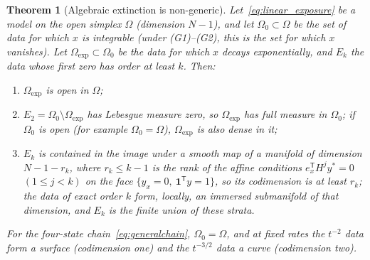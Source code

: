 \documentclass[11pt,a4paper]{article}
\newtheorem{theorem}{Theorem}[section]
\theoremstyle{definition}\newtheorem{definition}[theorem]{Definition}
\theoremstyle{remark}\newtheorem{remark}[theorem]{Remark}
\newcommand{\one}{\mathbf 1}
\begin{document}
\begin{theorem}[Algebraic extinction is non-generic]
\label{thm:generic}
Let~\eqref{eq:linear_exposure} be a model on the open simplex $\Omega$
(dimension $N-1$), and let $\Omega_0\subset\Omega$ be the set of data
for which $x$ is integrable (under (G1)--(G2), this is the set for which
$x$ vanishes). Let $\Omega_{\exp}\subset\Omega_0$ be the data for which
$x$ decays exponentially, and $E_k$ the data whose first zero has order
at least $k$. Then:
\begin{enumerate}[label=(\alph*)]
\item $\Omega_{\exp}$ is open in $\Omega$;
\item $E_2=\Omega_0\setminus\Omega_{\exp}$ has Lebesgue measure zero, so
$\Omega_{\exp}$ has full measure in $\Omega_0$; if $\Omega_0$ is open
(for example $\Omega_0=\Omega$), $\Omega_{\exp}$ is also dense in it;
\item $E_k$ is contained in the image under a smooth map of a manifold of
dimension $N-1-r_k$, where $r_k\le k-1$ is the rank of the affine
conditions $e_x^{\mathsf T}H^jy^*=0$ $(1\le j<k)$ on the face
$\{y_x=0,\ \one^{\mathsf T}y=1\}$, so its codimension is at least $r_k$;
the data of exact order $k$ form, locally, an immersed submanifold of
that dimension, and $E_k$ is the finite union of these strata.
\end{enumerate}
For the four-state chain~\eqref{eq:generalchain}, $\Omega_0=\Omega$,
and at fixed rates the $t^{-2}$ data form a surface (codimension one)
and the $t^{-3/2}$ data a curve (codimension two).
\end{theorem}
\end{document}
